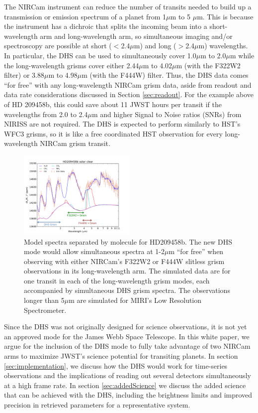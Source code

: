 \documentclass[iop]{emulateapj}
\begin{document}
The NIRCam instrument can reduce the number of transits needed to build up a transmission or emission spectrum of a planet from 1$\mu$m to 5 $\mu$m.
This is because the instrument has a dichroic that splits the incoming beam into a short-wavelength arm and long-wavelength arm, so simultaneous imaging and/or spectroscopy are possible at short ($<$2.4$\mu$m) and long ($>$2.4$\mu$m) wavelengths.
In particular, the DHS can be used to simultaneously cover 1.0$\mu$m to 2.0$\mu$m while the long-wavelength grisms cover either 2.44$\mu$m to 4.02$\mu$m (with the F322W2 filter) or 3.88$\mu$m to 4.98$\mu$m (with the F444W) filter.
Thus, the DHS data comes ``for free'' with any long-wavelength NIRCam grism data, aside from readout and data rate considerations discussed in Section \ref{sec:readout}.
For the example above of HD 209458b, this could save about 11 JWST hours per transit if the wavelengths from 2.0 to 2.4$\mu$m and higher Signal to Noise ratios (SNRs) from NIRISS are not required.
The DHS is expected to perform similarly to HST's WFC3 grisms, so it is like a free coordinated HST observation for every long-wavelength NIRCam grism transit.

\begin{figure}[!ht]
\includegraphics[width=0.5\textwidth]{molecules_DHS_HD209.pdf}
\caption{Model spectra separated by molecule for HD209458b.
The new DHS mode would allow simultaneous spectra at 1-2$\mu$m ``for free'' when observing with either NIRCam's F322W2 or F444W slitless grism observations in its long-wavelength arm.
The simulated data are for one transit in each of the long-wavelength grism modes, each accompanied by simultaneous DHS grism spectra.
The observations longer than 5$\mu$m are simulated for MIRI's Low Resolution Spectrometer.}\label{fig:DHSmolecules}
\end{figure}

Since the DHS was not originally designed for science observations, it is not yet an approved mode for the James Webb Space Telescope.
In this white paper, we argue for the inclusion of the DHS mode to fully take advantage of two NIRCam arms to maximize JWST's science potential for transiting planets.
In section \ref{sec:implementation}, we discuss how the DHS would work for time-series observations and the implications of reading out several detectors simultaneously at a high frame rate.
In section \ref{sec:addedScience} we discuss the added science that can be achieved with the DHS, including the brightness limits and improved precision in retrieved parameters for a representative system.
\end{document}
